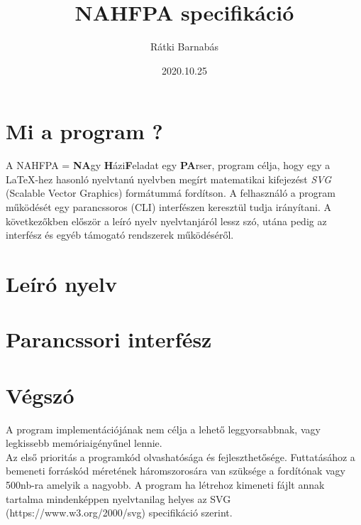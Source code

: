 \documentclass{article}[12pt,a4paper]
\title{NAHFPA specifikáció}
\author{Rátki Barnabás}
\date{2020.10.25}
\begin{document}
    \maketitle

    \tableofcontents

    \section{Mi a program ?}\label{sec:mi-a-program-?}
    A NAHFPA = \textbf{NA}gy \textbf{H}ázi\textbf{F}eladat egy \textbf{PA}rser, program célja, hogy egy a \LaTeX -hez hasonló nyelvtanú
    nyelvben megírt matematikai kifejezést \textit{SVG} (Scalable Vector Graphics) formátummá fordítson.
    A felhasználó a program működését egy parancssoros (CLI) interfészen keresztül tudja irányítani.
    A következőkben először a leíró nyelv nyelvtanjáról lessz szó, utána pedig az interfész és egyéb támogató rendszerek működéséről.

    \section{Leíró nyelv}\label{sec:leíró-nyelv}
    

    \section{Parancssori interfész}\label{sec:cli}
    

    \section{Végszó}\label{sec:vég}
    A program implementációjának nem célja a lehető leggyorsabbnak, vagy legkissebb memóriaigényűnel lennie.\\
    Az első prioritás a programkód olvashatósága és fejleszthetősége.
    Futtatásához a bemeneti forráskód méretének háromszorosára van szüksége a fordítónak vagy 500nb-ra amelyik a nagyobb.
    A program ha létrehoz kimeneti fájlt annak tartalma mindenképpen nyelvtanilag helyes az SVG (https://www.w3.org/2000/svg) specifikáció szerint.
\end{document}
